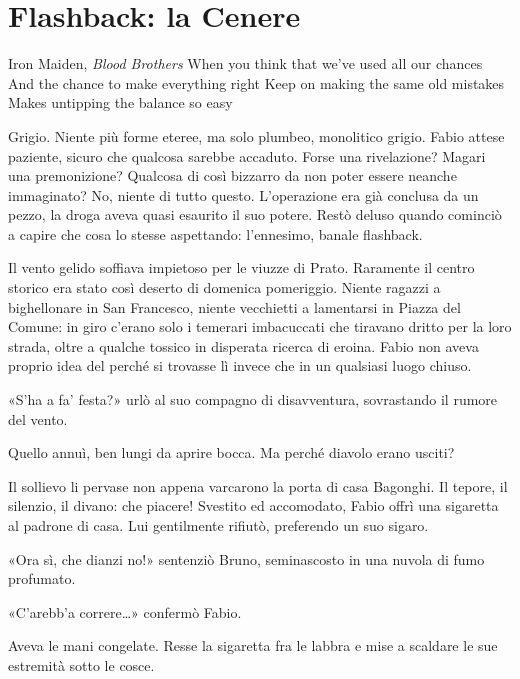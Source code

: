 \chapter{Flashback: la Cenere}

\begin{chapquote}{Iron Maiden, \textit{Blood Brothers}}
	When you think that we've used all our chances\newline
	And the chance to make everything right\newline
	Keep on making the same old mistakes\newline
	Makes untipping the balance so easy
\end{chapquote}


Grigio. Niente più forme eteree, ma solo plumbeo, monolitico grigio. Fabio attese paziente, sicuro che qualcosa sarebbe accaduto. Forse una rivelazione? Magari una premonizione? Qualcosa di così bizzarro da non poter essere neanche immaginato? No, niente di tutto questo. L'operazione era già conclusa da un pezzo, la droga aveva quasi esaurito il suo potere. Restò deluso quando cominciò a capire che cosa lo stesse aspettando: l'ennesimo, banale flashback.

Il vento gelido soffiava impietoso per le viuzze di Prato. Raramente il centro storico era stato così deserto di domenica pomeriggio. Niente ragazzi a bighellonare in San Francesco, niente vecchietti a lamentarsi in Piazza del Comune: in giro c'erano solo i temerari imbacuccati che tiravano dritto per la loro strada, oltre a qualche tossico in disperata ricerca di eroina. Fabio non aveva proprio idea del perché si trovasse lì invece che in un qualsiasi luogo chiuso.

«S'ha a fa' festa?» urlò al suo compagno di disavventura, sovrastando il rumore del vento.

Quello annuì, ben lungi da aprire bocca. Ma perché diavolo erano usciti?

Il sollievo li pervase non appena varcarono la porta di casa Bagonghi. Il tepore, il silenzio, il divano: che piacere! Svestito ed accomodato, Fabio offrì una sigaretta al padrone di casa. Lui gentilmente rifiutò, preferendo un suo sigaro.

«Ora sì, che dianzi no!» sentenziò Bruno, seminascosto in una nuvola di fumo profumato.

«C'arebb'a correre\ldots» confermò Fabio.

Aveva le mani congelate. Resse la sigaretta fra le labbra e mise a scaldare le sue estremità sotto le cosce.

